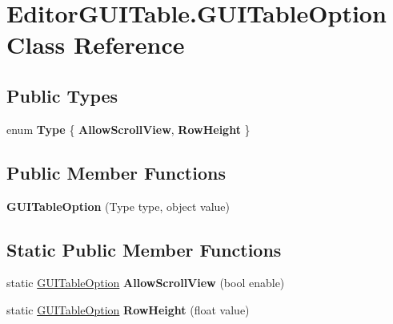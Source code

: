 \hypertarget{class_editor_g_u_i_table_1_1_g_u_i_table_option}{}\section{Editor\+G\+U\+I\+Table.\+G\+U\+I\+Table\+Option Class Reference}
\label{class_editor_g_u_i_table_1_1_g_u_i_table_option}
\subsection*{Public Types}
\begin{DoxyCompactItemize}
\item 
\mbox{\label{class_editor_g_u_i_table_1_1_g_u_i_table_option_a095cb87443fb1af279bfdad89fc97979}} 
enum {\bfseries Type} \{ {\bfseries Allow\+Scroll\+View}, 
{\bfseries Row\+Height}
 \}
\end{DoxyCompactItemize}
\subsection*{Public Member Functions}
\begin{DoxyCompactItemize}
\item 
\mbox{\label{class_editor_g_u_i_table_1_1_g_u_i_table_option_a985af09f31c25e1473e42d310f17ec61}} 
{\bfseries G\+U\+I\+Table\+Option} (Type type, object value)
\end{DoxyCompactItemize}
\subsection*{Static Public Member Functions}
\begin{DoxyCompactItemize}
\item 
\mbox{\label{class_editor_g_u_i_table_1_1_g_u_i_table_option_a7136ea1312738cf943f7318b9d96baff}} 
static \mbox{\hyperlink{class_editor_g_u_i_table_1_1_g_u_i_table_option}{G\+U\+I\+Table\+Option}} {\bfseries Allow\+Scroll\+View} (bool enable)
\item 
\mbox{\label{class_editor_g_u_i_table_1_1_g_u_i_table_option_a2cdf1ca2f313a150f12e08bee2e034a0}} 
static \mbox{\hyperlink{class_editor_g_u_i_table_1_1_g_u_i_table_option}{G\+U\+I\+Table\+Option}} {\bfseries Row\+Height} (float value)
\end{DoxyCompactItemize}
